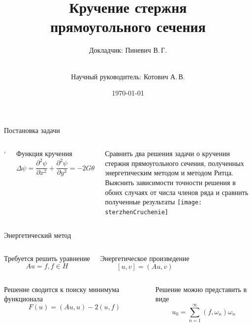 \documentclass[ignoreonframetext,unicode]{beamer}
\title[Кручение стержня]{Кручение стержня\\ прямоугольного сечения}
\author[Пиневич В.\,Г.]{Докладчик: Пиневич В.\,Г.\and\\[0.5mm] Научный руководитель: Котович А.\,В.}
\institute[каф. Прикладная математика ФН-2]{группа ФН2-51Б}
\date{\today}
\begin{document}
	
	\begin{frame}[plain]
		\maketitle
	\end{frame}

	\begin{frame}{Постановка задачи}
		\begin{columns}
			\column{\textwidth}`
			\begin{block}{Функция кручения}
			 \[
	\label{funCruc}
\Delta \psi = \frac{\partial^2 \psi }{\partial x^2} +
\frac{\partial^2 \psi }{\partial y^2} = -2G \theta 
			 \]
			\end{block}

		\begin{columns}
			Сравнить два решения задачи о кручении стержня прямоугольного сечения, полученных энергетическим методом и методом Ритца. Выяснить зависимости точности решения в обоих случаях от числа членов ряда и сравнить полученные результаты
			\texttt{[image: sterzhenСruchenie]}
		\end{columns}

		\end{columns}
		
	\end{frame}

	\begin{frame}{Энергетический метод}	
		
		\begin{columns}
			\column{0.5\textwidth}
			\begin{block}{Требуется решить уравнение}	
				\[
Au = f, f \in H
				\]
			\end{block}
		\column{0.5\textwidth}
		\begin{block}{Энергетическое произведение}	
\[
[u, v] = (Au, v)
\]
		\end{block}
		\end{columns}
				
	\begin{columns}
		\column{0.5\textwidth}
		\begin{block}{Решение сводится к поиску минимума функционала}	
	\[
	F(u) = (Au, u) - 2(u, f)
	\]
\end{block}
			\column{0.5\textwidth}
	\begin{block}{Решение можно представить в виде}
		\[
		u_0 = \sum\limits_{n = 1}^{\infty} (f, \omega_n)\omega_n
		\]
	\end{block}
	\end{columns}
	
	\end{frame}
\end{document}
